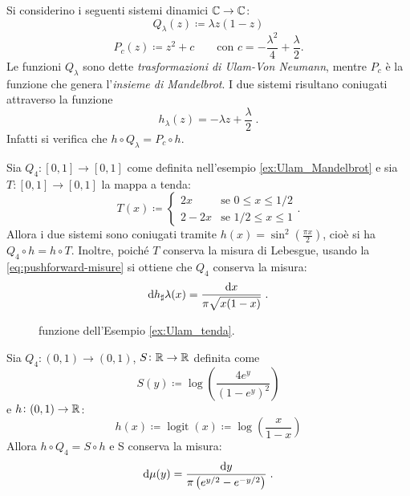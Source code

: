 \begin{example} \label{ex:Ulam_Mandelbrot}
Si considerino i seguenti sistemi dinamici $ \mathbb{C} \to \mathbb{C}$:
\[ Q_\lambda(z) \coloneqq \lambda z (1-z) \]
\[ P_c(z) \coloneqq z^2 + c \qquad \text{con } c = - \frac{\lambda^2}{4} +  \frac{\lambda}{2}. \]
Le funzioni $ Q_\lambda $ sono dette \emph{trasformazioni di Ulam-Von Neumann}, mentre $P_c$ è la funzione che genera l'\emph{insieme di Mandelbrot}.
I due sistemi risultano coniugati attraverso la funzione
\[ h_\lambda(z) = -\lambda z + \frac{\lambda}{2}\;. \]
Infatti si verifica che $ h\circ Q_\lambda = P_c \circ h $.
\end{example}

\begin{example} \label{ex:Ulam_tenda}
    Sia $ Q_4 \colon [0,1] \to [0,1] $ come definita nell'esempio \ref{ex:Ulam_Mandelbrot} e sia $ T\colon [0,1] \to [0,1] $ la mappa a tenda:
    \[
        T(x) \coloneqq
        \begin{cases}
            2x   & \text{se } 0 \leq x \leq 1/2 \\
            2-2x & \text{se } 1/2 \leq x \leq 1
        \end{cases}.
    \]
    Allora i due sistemi sono coniugati tramite $ h(x) = \sin^2\left(\frac{\pi x}{2}\right) $, cioè si ha $ Q_4\circ h = h\circ T $.
    Inoltre, poiché $ T $ conserva la misura di Lebesgue, usando la \eqref{eq:pushforward-misure} si ottiene che $ Q_4 $ conserva la misura:
    \[ \dif{h_\sharp \lambda}(x) = \frac{\dif x}{\pi\sqrt{x(1-x)}}\; . \]

    \iffigureon
    \begin{figure}
        \begin{center}
            \subfloat[Trasformazione $ Q_4 $]
            {  }
        \end{center}
        \caption{funzione dell'Esempio \ref{ex:Ulam_tenda}.}
    \end{figure}
    \fi
\end{example}

\begin{example}
    Sia $ Q_4\colon (0,1)\to(0,1) $, $ S\colon \mathbb{R} \to \mathbb{R} $ definita come
    \[ S(y) \coloneqq \log\left(\frac{4 e^y}{(1-e^y)^2}\right) \]
    e $ h\colon (0,1)\to\mathbb{R} $:
    \[ h(x) \coloneqq \operatorname{logit}(x) \coloneqq \log\left(\frac{x}{1-x}\right) \]
    Allora $ h\circ Q_4 = S \circ h $ e S conserva la misura:
    \[ \dif\mu(y) = \frac{\dif y}{\pi\left( e^{y/2} - e^{-y/2} \right) } \; . \]
\end{example}

